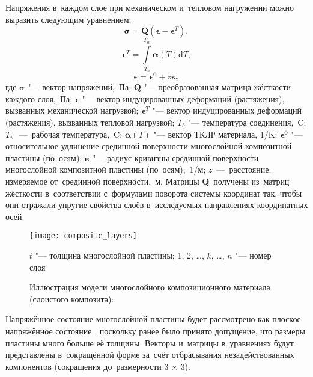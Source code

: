 Напряжения в~каждом слое при механическом и~тепловом нагружении можно выразить
следующим уравнением:
\begin{equation}\label{eq:form_sigma_Q}
    \boldsymbol{\sigma}
    =
    \mathbf{Q} (\boldsymbol{\epsilon} - \boldsymbol{\epsilon}^{T}),
\end{equation}
\[
    \boldsymbol{\epsilon}^{T} = \int\limits_{T_{b}}^{T_{w}} \boldsymbol{\alpha}(T)\mathrm{d}T,
\]
\[
    \boldsymbol{\epsilon} = \boldsymbol{\epsilon^0} + z \boldsymbol{\kappa},
\]
где $\boldsymbol{\sigma}$ "--- вектор напряжений,~Па;
$\mathbf{Q}$ "--- преобразованная матрица жёсткости каждого слоя,~Па;
$\boldsymbol{\epsilon}$ "--- вектор индуцированных деформаций (растяжения), вызванных механической нагрузкой;
$\boldsymbol{\epsilon}^{T}$ "--- вектор индуцированных деформаций (растяжения), вызванных тепловой нагрузкой;
$T_{b}$ "--- температура соединения,~{\textdegree}C;
$T_{w}$~---~рабочая температура,~{\textdegree}C;
\(\boldsymbol{\alpha}(T)\) "--- вектор ТКЛР материала, 1/K;
$\boldsymbol{\epsilon^0}$ "--- относительное удлинение срединной поверхности многослойной композитной пластины (по~осям);
$\boldsymbol{\kappa}$ "--- радиус кривизны
срединной поверхности
многослойной композитной пластины (по~осям),~1/м;
$z$~---~расстояние, измеряемое от~срединной поверхности,~м.
Матрицы $\mathbf{Q}$~получены из~матриц жёсткости в~соответствии с~формулами
поворота системы координат \cites[С.~18,~215,~224]{Alfutov1984_povorot_matric} так,
чтобы они отражали упругие свойства слоёв в~исследуемых направлениях
координатных осей.
\begin{figure}[!htbp]
    \centering
    \texttt{[image: composite\_layers]}

    \caption{Иллюстрация модели многослойного композиционного материала (слоистого композита):}
    \label{fig:sloisty_kompozit}
    $t$ "--- толщина многослойной пластины; 1, 2, \dots, $k$, \dots, $n$ "--- номер слоя
\end{figure}

\begingroup
Напряжённое состояние многослойной пластины будет рассмотрено как плоское
напряжённое состояние \cites[14]{Alfutov1984_povorot_matric}, поскольку ранее
было принято допущение, что размеры пластины много больше её толщины.
Векторы и~матрицы в~уравнениях будут представлены в~сокращённой форме за~счёт
отбрасывания незадействованных компонентов
(сокращения до~размерности 3\(\,\times\,\)3).\russianpar
\endgroup

